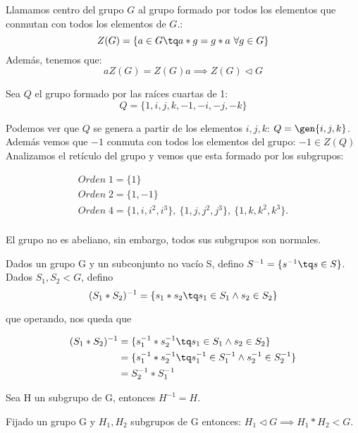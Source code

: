 \documentclass[nochap]{apuntes}
\begin{document}
\begin{defn}
	Llamamos centro del grupo $G$ al grupo formado por todos los elementos que conmutan con todos los elementos de $G$.:\\
	\[ Z(G) = \{ a\in G\tq a\ast g = g\ast a\ \forall g\in G\} \]
	Además, tenemos que:
	\[ aZ(G)=Z(G)a \implies Z(G)\lhd G \]
  \end{defn}

  \begin{example}
	Sea $Q$ el grupo formado por las raíces cuartas de 1:
	\[ Q = \{ 1, i, j, k, -1, -i, -j, -k\} \]

	Podemos ver que $Q$ se genera a partir de los elementos $i, j, k$: $Q = \gen{i,j,k}$.
	Además vemos que $-1$ conmuta con todos los elementos del grupo: $-1 \in Z(Q)$
	Analizamos el retículo del grupo y vemos que esta formado por los subgrupos:

	\begin{gather*}
	Orden\; 1 = \{ 1\}\\
	Orden\; 2 = \{ 1, -1\} \\
	Orden\; 4 = \{ 1, i, i^2, i^3\},\
			  \{ 1, j, j^2, j^3 \},\
			  \{ 1, k, k^2, k^3 \}.\\
			  \end{gather*}


	El grupo no es abeliano, sin embargo, todos sus subgrupos son normales.

  \end{example}


 Dados un grupo G y un subconjunto no vacío S, defino $S^{-1}=\{s^{-1}\tq s\in S\}$. Dados $S_{1},S_{2}<G$, defino  \[ (S_{1}\ast S_{2})^{-1}=\{s_{1}\ast s_{2}\tq s_{1}\in S_{1} \wedge s_{2}\in S_{2}\} \]

 que operando, nos queda que

 \begin{align*}
 (S_1 \ast S_2)^{-1} &= \{s_{1}^{-1}\ast s_{2}^{-1}\tq s_{1}\in S_{1} \wedge s_{2}\in S_{2}\}\\
 &= \{s_{1}^{-1}\ast s_{2}^{-1}\tq s_{1}^{-1}\in S_{1}^{-1} \wedge s_{2}^{-1}\in S_{2}^{-1}\} \\
 & =S_{2}^{-1}\ast S_{1}^{-1}
 \end{align*}

 Sea H un subgrupo de G, entonces $H^{-1}=H$.

 \begin{theorem}
  Fijado un grupo G y $H_{1}, H_{2}$  subgrupos de G entonces: $H_{1} \lhd G \implies H_{1}\ast H_{2}<G$.
 \end{theorem}
\end{document}
